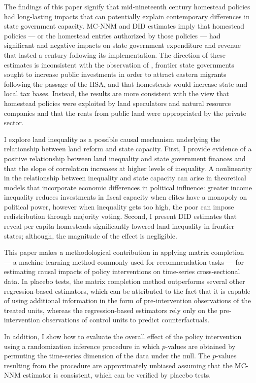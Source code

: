 \documentclass[12pt]{article}
\begin{document}
The findings of this paper signify that mid-nineteenth century homestead policies had long-lasting impacts that can potentially explain contemporary differences in state government capacity. MC-NNM and DID estimates imply that homestead policies --- or the homestead entries authorized by those policies --- had significant and negative impacts on state government expenditure and revenue that lasted a century following its implementation. The direction of these estimates is inconsistent with the observation of \citet{engerman2005evolution}, frontier state governments sought to increase public investments in order to attract eastern migrants following the passage of the HSA, and that homesteads would increase state and local tax bases. Instead, the results are more consistent with the view that homestead policies were exploited by land speculators and natural resource companies and that the rents from public land were appropriated by the private sector. 

I explore land inequality as a possible causal mechanism underlying the relationship between land reform and state capacity. First, I provide evidence of a positive relationship between land inequality and state government finances and that the slope of correlation increases at higher levels of inequality. A nonlinearity in the relationship between inequality and state capacity can arise in theoretical models that incorporate economic differences in political influence: greater income inequality reduces investments in fiscal capacity when elites have a monopoly on political power, however when inequality gets too high, the poor can impose redistribution through majority voting. Second, I present DID estimates that reveal per-capita homesteads significantly lowered land inequality in frontier states; although, the magnitude of the effect is negligible. 

This paper makes a methodological contribution in applying matrix completion --- a machine learning method commonly used for recommendation tasks --- for estimating causal impacts of policy interventions on time-series cross-sectional data. In placebo tests, the matrix completion method outperforms several other regression-based estimators, which can be attributed to the fact that it is capable of using additional information in the form of pre-intervention observations of the treated units, whereas the regression-based estimators rely only on the pre-intervention observations of control units to predict counterfactuals. 

In addition, I show how to evaluate the overall effect of the policy intervention using a randomization inference procedure in which $p$-values are obtained by permuting the time-series dimension of the data under the null. The $p$-values resulting from the procedure are approximately unbiased assuming that the MC-NNM estimator is consistent, which can be verified by placebo tests. 

\newpage


\begin{singlespace}

\end{singlespace}


\itemize
\end{document}
